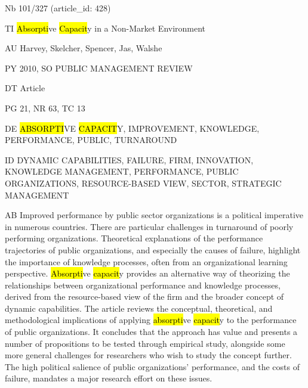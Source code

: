 \documentclass[a4paper]{article}
\begin{document}
\vspace*{-2cm}
Nb \tabto{0cm}101/327 (article\_id: 428)\par
TI \tabto{0cm}\hl{Absorpti}ve \hl{Capacit}y in a Non-Market Environment\par
AU \tabto{0cm}Harvey, Skelcher, Spencer, Jas, Walshe\par
PY \tabto{0cm}2010, SO PUBLIC MANAGEMENT REVIEW\par
DT \tabto{0cm}Article\par
PG \tabto{0cm}21, NR 63, TC 13\par
DE \tabto{0cm}\hl{ABSORPTI}VE \hl{CAPACIT}Y, IMPROVEMENT, KNOWLEDGE, PERFORMANCE, PUBLIC, TURNAROUND\par
ID \tabto{0cm}DYNAMIC CAPABILITIES, FAILURE, FIRM, INNOVATION, KNOWLEDGE MANAGEMENT, PERFORMANCE, PUBLIC ORGANIZATIONS, RESOURCE-BASED VIEW, SECTOR, STRATEGIC MANAGEMENT\par
AB \tabto{0cm}Improved performance by public sector organizations is a political imperative in numerous countries. There are particular challenges in turnaround of poorly performing organizations. Theoretical explanations of the performance trajectories of public organizations, and especially the causes of failure, highlight the importance of knowledge processes, often from an organizational learning perspective. \hl{Absorpti}ve \hl{capacit}y provides an alternative way of theorizing the relationships between organizational performance and knowledge processes, derived from the resource-based view of the firm and the broader concept of dynamic capabilities. The article reviews the conceptual, theoretical, and methodological implications of applying \hl{absorpti}ve \hl{capacit}y to the performance of public organizations. It concludes that the approach has value and presents a number of propositions to be tested through empirical study, alongside some more general challenges for researchers who wish to study the concept further. The high political salience of public organizations' performance, and the costs of failure, mandates a major research effort on these issues.\par
\clearpage
\end{document}

